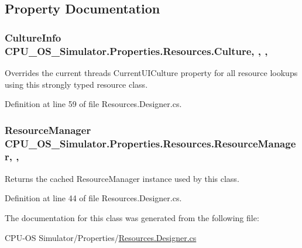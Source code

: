 \subsection{Property Documentation}
\hypertarget{class_c_p_u___o_s___simulator_1_1_properties_1_1_resources_aa592510b1ffdc479eca72adae099ab05}{}
\subsubsection[{Culture}]{\setlength{\rightskip}{0pt plus 5cm}Culture\+Info C\+P\+U\+\_\+\+O\+S\+\_\+\+Simulator.\+Properties.\+Resources.\+Culture\hspace{0.3cm}{\ttfamily [static]}, {\ttfamily [get]}, {\ttfamily [set]}, {\ttfamily [package]}}\label{class_c_p_u___o_s___simulator_1_1_properties_1_1_resources_aa592510b1ffdc479eca72adae099ab05}


Overrides the current thread\textquotesingle{}s Current\+U\+I\+Culture property for all resource lookups using this strongly typed resource class. 



Definition at line 59 of file Resources.\+Designer.\+cs.

\hypertarget{class_c_p_u___o_s___simulator_1_1_properties_1_1_resources_ab94d8d323ea515d9785b46e3824d8767}{}
\subsubsection[{Resource\+Manager}]{\setlength{\rightskip}{0pt plus 5cm}Resource\+Manager C\+P\+U\+\_\+\+O\+S\+\_\+\+Simulator.\+Properties.\+Resources.\+Resource\+Manager\hspace{0.3cm}{\ttfamily [static]}, {\ttfamily [get]}, {\ttfamily [package]}}\label{class_c_p_u___o_s___simulator_1_1_properties_1_1_resources_ab94d8d323ea515d9785b46e3824d8767}


Returns the cached Resource\+Manager instance used by this class. 



Definition at line 44 of file Resources.\+Designer.\+cs.



The documentation for this class was generated from the following file\+:\begin{DoxyCompactItemize}
\item 
C\+P\+U-\/\+O\+S Simulator/\+Properties/\hyperlink{_c_p_u-_o_s_01_simulator_2_properties_2_resources_8_designer_8cs}{Resources.\+Designer.\+cs}\end{DoxyCompactItemize}
